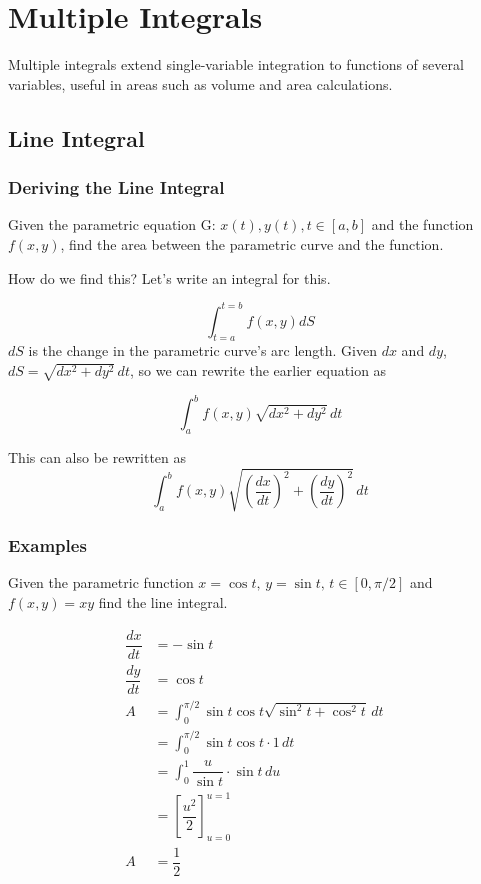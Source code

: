 \chapter{Multiple Integrals}
Multiple integrals extend single-variable integration to functions of several variables, useful in areas such as volume and area calculations.
\section{Line Integral}

\subsection{Deriving the Line Integral}
Given the parametric equation G: \(x(t), y(t), t \in [a, b]\) and the function \(f(x,y)\), find the area between the parametric curve and the function.

How do we find this? Let's write an integral for this.

\[
    \int_{t=a}^{t=b} f(x,y) dS 
\]
$dS$ is the change in the parametric curve's arc length. Given $dx$ and $dy$, \(dS = \sqrt{dx^2 + dy^2}\, dt\), so we can rewrite the earlier equation as
  
\[
    \int_{a}^{b} f(x, y) \sqrt{dx^2+dy^2}\, dt
\]

This can also be rewritten as 
\[
    \int_a^b f(x,y) \sqrt{\left(\dfrac{dx}{dt}\right)^2+\left(\dfrac{dy}{dt}\right)^2}\, dt
\]
\pagebreak
\subsection{Examples}
Given the parametric function $x = \cos{t}, \, y = \sin{t}, \,  t \in [0, \pi/2]$ and $f(x,y) = xy$ find the line integral.


\begin{align*}
    \dfrac{dx}{dt} &= -\sin{t}\qquad\qquad&\\
    \dfrac{dy}{dt} &= \cos{t}\\
    A &= \int_{0}^{\pi/2} \sin{t}\cos{t} \sqrt{\sin^2{t}+\cos^2{t}}\, dt\\
    &= \int_{0}^{\pi/2}  \sin{t}\cos{t} \cdot 1 \,dt\\
    &= \int_{0}^{1} \dfrac{u}{\sin{t}} \cdot {\sin{t}}\, du\\
    &= \left[\dfrac{u^2}{2}\right]_{u=0}^{u=1}\\
    A &= \dfrac{1}{2}
\end{align*}